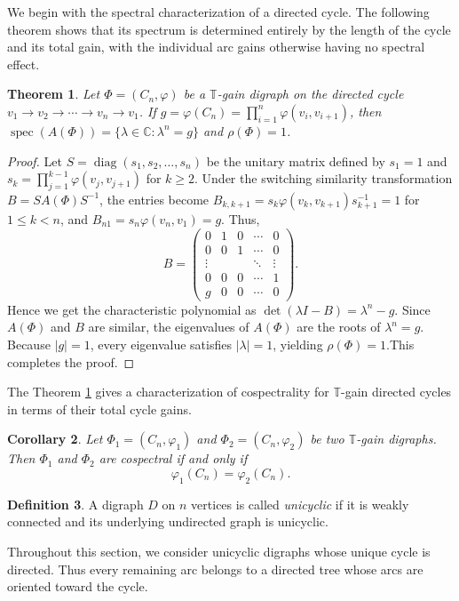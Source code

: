 \documentclass[12pt]{article}
\newtheorem{theorem}{Theorem}[section]
\newtheorem{corollary}[theorem]{Corollary}
\theoremstyle{definition}
\newtheorem{definition}[theorem]{Definition}
\newcommand{\TT}{\mathbb{T}}
\begin{document}
We begin with the spectral characterization of a directed cycle. The following theorem shows that its spectrum is determined entirely by the length of the cycle and its total gain, with the individual arc gains otherwise having no spectral effect.

\begin{theorem}\label{thm:cycle-spectrum}
Let $\Phi=(C_n,\varphi)$ be a $\mathbb{T}$-gain digraph on the directed cycle $v_1\to v_2\to\cdots\to v_n\to v_1$. If $g=\varphi(C_n)=\prod_{i=1}^{n}\varphi(v_i,v_{i+1})$, then $\operatorname{spec}(A(\Phi)) = \{\lambda\in\mathbb{C}:\lambda^n=g\}$ and $\rho(\Phi)=1$.
\end{theorem}

\begin{proof}
Let $S=\operatorname{diag}(s_1,s_2, \ldots,s_n)$ 
be the unitary matrix defined by $s_1=1$ and $s_k=\prod_{j=1}^{k-1}\varphi(v_j,v_{j+1})$ for $k\ge 2$. Under the switching similarity transformation $B=SA(\Phi)S^{-1}$, the entries become $B_{k,k+1} = s_k\varphi(v_k,v_{k+1})s_{k+1}^{-1} = 1$ for $1\le k < n$, and $B_{n1} = s_n\varphi(v_n,v_1) = g$. Thus, 
\[
B=
\begin{pmatrix}
0&1&0&\cdots&0\\
0&0&1&\cdots&0\\
\vdots&&&\ddots&\vdots\\
0&0&0&\cdots&1\\
g&0&0&\cdots&0
\end{pmatrix}.
\] 
Hence we get the characteristic polynomial as $\det(\lambda I-B)=\lambda^n-g$. Since $A(\Phi)$ and $B$ are similar, the eigenvalues of $A(\Phi)$ are the roots of $\lambda^n=g$. Because $|g|=1$, every eigenvalue satisfies $|\lambda|=1$, yielding $\rho(\Phi)=1$.This completes the proof.
\end{proof}

The Theorem \ref{thm:cycle-spectrum} gives a characterization of cospectrality for $\TT$-gain directed cycles in terms of their total cycle gains.

\begin{corollary}
\label{cor:cycle-cospectral}
Let $\Phi_1=(C_n,\varphi_1)$ and $\Phi_2=(C_n,\varphi_2)$ be two
$\TT$-gain digraphs. Then $\Phi_1$ and $\Phi_2$ are cospectral if and
only if
\[
\varphi_1(C_n)=\varphi_2(C_n).
\]
\end{corollary}

\begin{definition}
A digraph $D$ on $n$ vertices is called \emph{unicyclic} if it is weakly connected and its underlying undirected graph is unicyclic. 

Throughout this section, we consider unicyclic digraphs whose unique cycle is directed. Thus every remaining arc belongs to a directed tree whose arcs are oriented toward the cycle.
\end{definition}
\end{document}
